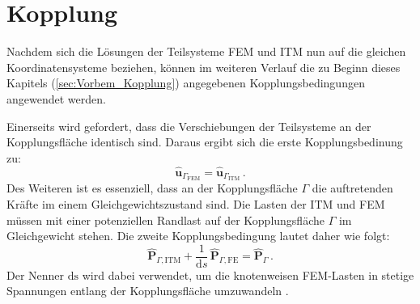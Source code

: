 \section{Kopplung}
\label{sec:Kopplung}

Nachdem sich die Lösungen der Teilsysteme FEM und ITM nun auf die gleichen Koordinatensysteme beziehen, können im weiteren Verlauf die zu Beginn dieses Kapitels (\ref{sec:Vorbem_Kopplung}) angegebenen Kopplungsbedingungen angewendet werden.

Einerseits wird gefordert, dass die Verschiebungen der Teilsysteme an der Kopplungsfläche identisch sind. Daraus ergibt sich die erste Kopplungsbedinung zu:
\begin{equation}\label{eq:Kopplbed_u}
	\hat{\mathbf u}_{\Gamma_{\mathrm{FEM}}}
	= \hat{\mathbf u}_{\Gamma_{\mathrm{ITM}}}\,.
\end{equation}
Des Weiteren ist es essenziell, dass an der Kopplungsfläche $\Gamma$ die auftretenden Kräfte im einem Gleichgewichtszustand sind. Die Lasten der ITM und FEM müssen mit einer potenziellen Randlast auf der Kopplungsfläche $\Gamma$ im Gleichgewicht stehen. Die zweite Kopplungsbedingung lautet daher wie folgt: 
\begin{equation}\label{eq:Kopplbed_p}
	\hat{\mathbf P}_{\Gamma,\mathrm{ITM}}
	+ \frac{1}{\mathrm d s}\,\hat{\mathbf P}_{\Gamma,\mathrm{FE}}
	= \hat{\mathbf P}_{\Gamma}\,.
\end{equation}
Der Nenner $\mathrm{ds}$ wird dabei verwendet, um die knotenweisen FEM-Lasten in stetige Spannungen entlang der Kopplungsfläche umzuwandeln \cite{Hackenberg2016}.

